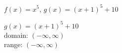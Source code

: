 {$f(x) = x^5$, $g(x) = (x+1)^5+10$
}
{$g(x) = (x+1)^5+10$\\
domain: $(-\infty, \infty)$\\
range: $(-\infty, \infty)$

\begin{center}
\end{center}}